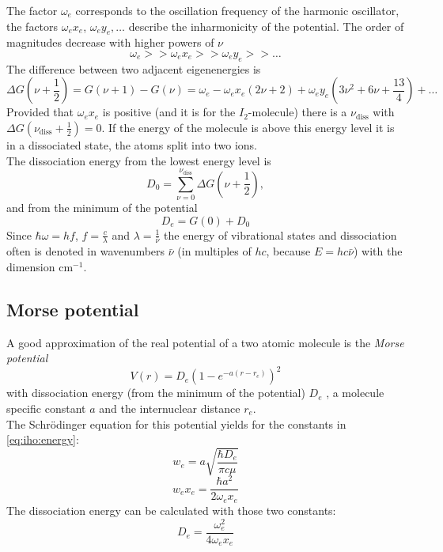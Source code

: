 The factor $\omega_e$ corresponds to the oscillation frequency of the harmonic oscillator, the factors $\omega_e x_e$, $\omega_e y_e, \ldots$ 
describe the inharmonicity of the potential. The order of magnitudes decrease with higher powers of $\nu$
\begin{equation}
  \omega_e >> \omega_e x_e >> \omega_e y_e >> \ldots
\end{equation}
The difference between two adjacent eigenenergies is
\begin{equation}
\label{eq:iho:energydiff}
  \Delta G \left( \nu + \frac{1}{2} \right) = G(\nu + 1) - G(\nu) = \omega_e - \omega_e x_e (2\nu + 2) + \omega_e y_e \left( 3\nu^2 + 6 \nu + \frac{13}{4} \right) + \ldots 
\end{equation}
Provided that $\omega_e x_e$ is positive (and it is for the $I_2$-molecule) there is a 
$\nu_{\text{diss}}$ with ${\Delta G (\nu_{\text{diss}} + \frac{1}{2}) = 0}$. If the energy of the molecule is above this energy level it 
is in a dissociated state, the atoms split into two ions. \\
The dissociation energy from the lowest energy level is
\begin{equation}
\label{eq:dissenergy}
  D_0 = \sum_{\nu=0}^{\nu_{\text{diss}}} \Delta G \left( \nu + \frac{1}{2} \right),
\end{equation}
and from the minimum of the potential
\begin{equation}
  \label{eq:dissenergy2}
  D_e = G(0) + D_0
\end{equation} 
Since $\hbar \omega = h f$, $f = \frac{c}{\lambda}$ and $\lambda = \frac{1}{\bar{\nu}}$ the energy of vibrational states and dissociation often 
is denoted in wavenumbers $\bar{\nu}$ 
(in multiples of $h c$, because $E = hc\bar{\nu}$) with the dimension $\text{cm}^{-1}$.

\subsection{Morse potential}
A good approximation of the real potential of a two atomic molecule is the \emph{Morse potential}
\begin{equation}
  V(r) = D_e \left( 1 - e^{-a(r-r_e)} \right)^2
\end{equation}
with dissociation energy (from the minimum of the potential) $D_e$	, a molecule specific constant $a$  and the internuclear distance $r_e$. \\
The Schrödinger equation for this potential yields for the constants in \autoref{eq:iho:energy}:
\begin{equation}
\label{eq:morse_we}
  w_e = a \sqrt{\frac{\hbar D_e}{\pi c \mu}}
\end{equation}
\begin{equation}
\label{eq_morse_wexe}
  w_e x_e = \frac{\hbar a^2}{2 \omega_e x_e}
\end{equation}
The dissociation energy can be calculated with those two constants:
\begin{equation}
\label{eq:morse_dissenergy}
  D_e = \frac{\omega_e^2}{4 \omega_e x_e}
\end{equation}

